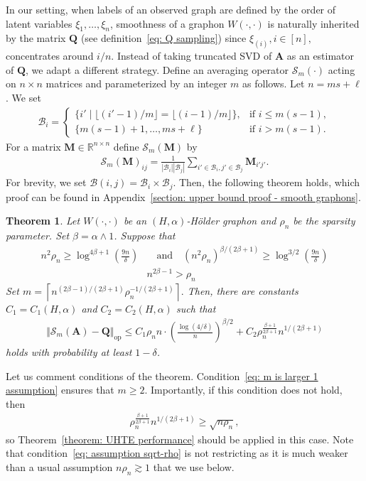 \documentclass[11pt]{article}
\newcommand{\bbR}{\mathbb{R}}
\newcommand{\op}{\mathrm{op}}
\newcommand{\bA}{\bm{A}}
\newcommand{\bM}{\bm{M}}
\newcommand{\bQ}{\bm{Q}}
\newcommand{\cB}{\mathcal{B}}
\newcommand{\<}{\langle}
\renewcommand{\>}{\rangle}
\newcommand{\cS}{\mathcal{S}}
\theoremstyle{plain}
\newtheorem{theorem}{Theorem}
\theoremstyle{definition}
\theoremstyle{remark}
\begin{document}
{
In our setting, when labels of an observed graph are defined by the order of latent variables $\xi_1, \ldots, \xi_n$, smoothness of a graphon $W(\cdot, \cdot)$ is naturally inherited by the matrix $\bQ$ (see definition~\eqref{eq: Q sampling}) since $\xi_{(i)}, i \in [n],$ concentrates around $i/n$. Instead of taking truncated SVD of $\bA$ as an estimator of $\bQ$, we adapt a different strategy. Define an averaging operator $\cS_m(\cdot)$ acting on $n\times n$ matrices and parameterized by an integer $m$ as follows. Let $n = m s + \ell$. We set 
\begin{align*}
    \cB_i = \begin{cases}
        \{i' \mid \lfloor (i' - 1)/m \rfloor = \lfloor (i - 1)/ m \rfloor\}, & \text{if } i \le m (s - 1), \\
        \{m(s - 1) + 1, \ldots, m s + \ell \} & \text{if } i > m(s - 1).
    \end{cases}
\end{align*}
For a matrix $\bM \in \bbR^{n \times n}$ define $\cS_m (\bM)$ by
\begin{align*}
    \cS_m(\bM)_{ij} = \frac{1}{|\cB_i||\cB_j|} \sum_{i' \in \cB_i, j' \in \cB_j} \bM_{i' j'}.
\end{align*}
For brevity, we set $\cB(i, j) = \cB_i \times \cB_j $. Then, the following theorem holds, which proof can be found in Appendix~\ref{section: upper bound proof - smooth graphons}.
\begin{theorem}
\label{theorem: Holder averaging}
    Let $W(\cdot, \cdot)$ be an $(H, \alpha)$-H\"older graphon and $\rho_n$ be the sparsity parameter. Set $\beta = \alpha \wedge 1$. Suppose that
    \begin{align}
         n^2 \rho_n  \ge \log^{4 \beta + 1} \left (\frac{9 n}{\delta} \right ) & \quad \text{and} \quad (n^2 \rho_n)^{\beta / (2 \beta + 1)} \ge \log^{3/2} \left (\frac{9n}{\delta} \right ) \label{eq: assumption sqrt-rho}\\
        & n^{2 \beta - 1}  > \rho_n \label{eq: m is larger 1 assumption}
    \end{align}
    Set $m = \left \lceil n^{(2 \beta - 1)/(2 \beta + 1)} \rho_n^{-1/(2 \beta + 1)} \right \rceil.$ 
    Then, there are constants $C_ 1= C_1(H, \alpha)$ and $C_ 2= C_2(H, \alpha)$ such that
    \begin{align*}
        \Vert\cS_m(\bA) - \bQ \Vert_{\op} \le  C_1 \rho_n n \cdot \left ( \frac{\log(4/\delta)}{n} \right )^{\beta/2}  + C_2\rho_n^{\frac{\beta + 1}{2 \beta + 1}} n^{1/(2 \beta + 1) 
    }
    \end{align*}
    holds with probability at least $1 - \delta$.
\end{theorem}
Let us comment conditions of the theorem. Condition~\eqref{eq: m is larger 1 assumption} ensures that $m \ge 2$. Importantly, if this condition does not hold, then 
\begin{align*}
    \rho_n^{\frac{\beta + 1}{2 \beta + 1}} n^{1/(2 \beta + 1)} \ge \sqrt{n \rho_n},
\end{align*}
so Theorem~\ref{theorem: UHTE performance} should be applied in this case.  Note that condition~\eqref{eq: assumption sqrt-rho} is not restricting as it is much weaker than a usual assumption $n \rho_n \gtrsim 1$ that we use below.

}
\end{document}

